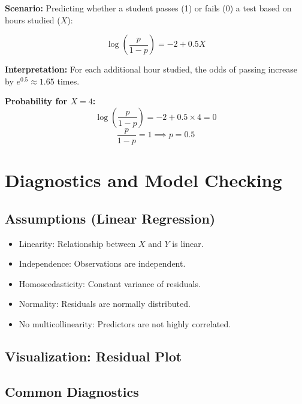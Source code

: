 \documentclass[11pt]{article}
\begin{document}
\textbf{Scenario:} Predicting whether a student passes (1) or fails (0) a test based on hours studied ($X$):

\[
\log\left( \frac{p}{1-p} \right) = -2 + 0.5 X
\]

\textbf{Interpretation:} For each additional hour studied, the odds of passing increase by $e^{0.5} \approx 1.65$ times.

\textbf{Probability for $X=4$:}
\[
\log\left( \frac{p}{1-p} \right) = -2 + 0.5 \times 4 = 0
\]
\[
\frac{p}{1-p} = 1 \implies p = 0.5
\]

\section{Diagnostics and Model Checking}

\subsection{Assumptions (Linear Regression)}

\begin{itemize}
    \item Linearity: Relationship between $X$ and $Y$ is linear.
    \item Independence: Observations are independent.
    \item Homoscedasticity: Constant variance of residuals.
    \item Normality: Residuals are normally distributed.
    \item No multicollinearity: Predictors are not highly correlated.
\end{itemize}

\subsection*{Visualization: Residual Plot}
\begin{center}
\end{center}

\subsection{Common Diagnostics}
\end{document}

